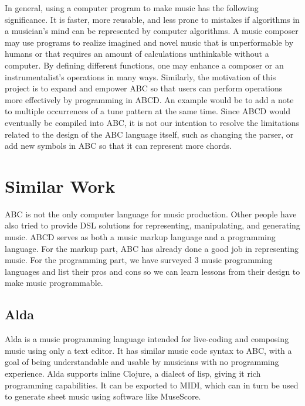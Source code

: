 In general, using a computer program to make music has the following significance. It is faster, more reusable, and less prone to mistakes if  algorithms in a musician's mind can be represented by computer algorithms. A music composer may use programs to realize imagined and novel music that is unperformable by humans or that requires an amount of calculations unthinkable without a computer. By defining different functions, one may enhance a composer or an instrumentalist's operations in many ways\cite{Dobrian88}. Similarly, the motivation of this project is to expand and empower ABC so that users can perform operations more effectively by programming in ABCD. An example would be to add a note to multiple occurrences of a tune pattern at the same time.  Since ABCD would eventually be compiled into ABC, it is not our intention to resolve the limitations related to the design of the ABC language itself, such as changing the parser, or add new symbols in ABC so that it can represent more chords.



\section{Similar Work}

ABC is not the only computer language for music production. Other people have also tried to provide DSL solutions for representing, manipulating, and generating music. ABCD serves as both a music markup language and a programming language. For the markup part, ABC has already done a good job in representing music. For the programming part, we have surveyed 3 music programming languages and list their pros and cons so we can learn lessons from their design to make music programmable.

\subsection{Alda}

Alda is a music programming language intended for live-coding and composing music using only a text editor. It has similar music code syntax to ABC, with a goal of being understandable and usable by musicians with no programming experience\cite{Yarwood15}. Alda supports inline Clojure, a dialect of lisp\cite{Hickey17}, giving it rich programming capabilities. It can be exported to MIDI\cite{Yarwood15_2}, which can in turn be used to generate sheet music using software like MuseScore\cite{MuseScore17}. 

